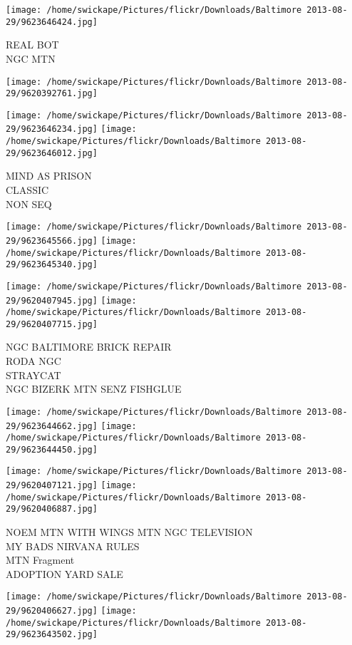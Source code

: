\documentclass[10pt,letterpaper]{article}
\begin{document}
\vspace{0.25in}
\texttt{[image: /home/swickape/Pictures/flickr/Downloads/Baltimore 2013-08-29/9623646424.jpg]}

REAL BOT\\
NGC MTN
\pagebreak

\texttt{[image: /home/swickape/Pictures/flickr/Downloads/Baltimore 2013-08-29/9620392761.jpg]}

\vspace{0.25in}
\texttt{[image: /home/swickape/Pictures/flickr/Downloads/Baltimore 2013-08-29/9623646234.jpg]}
\texttt{[image: /home/swickape/Pictures/flickr/Downloads/Baltimore 2013-08-29/9623646012.jpg]}

MIND AS PRISON\\
CLASSIC\\
NON SEQ
\pagebreak

\texttt{[image: /home/swickape/Pictures/flickr/Downloads/Baltimore 2013-08-29/9623645566.jpg]}
\texttt{[image: /home/swickape/Pictures/flickr/Downloads/Baltimore 2013-08-29/9623645340.jpg]}

\texttt{[image: /home/swickape/Pictures/flickr/Downloads/Baltimore 2013-08-29/9620407945.jpg]}
\texttt{[image: /home/swickape/Pictures/flickr/Downloads/Baltimore 2013-08-29/9620407715.jpg]}

NGC BALTIMORE BRICK REPAIR\\
RODA NGC\\
STRAYCAT\\
NGC BIZERK MTN SENZ FISHGLUE
\pagebreak

\texttt{[image: /home/swickape/Pictures/flickr/Downloads/Baltimore 2013-08-29/9623644662.jpg]}
\texttt{[image: /home/swickape/Pictures/flickr/Downloads/Baltimore 2013-08-29/9623644450.jpg]}

\texttt{[image: /home/swickape/Pictures/flickr/Downloads/Baltimore 2013-08-29/9620407121.jpg]}
\texttt{[image: /home/swickape/Pictures/flickr/Downloads/Baltimore 2013-08-29/9620406887.jpg]}

NOEM MTN WITH WINGS MTN NGC TELEVISION\\
MY BADS NIRVANA RULES\\
MTN Fragment\\
ADOPTION YARD SALE
\pagebreak

\texttt{[image: /home/swickape/Pictures/flickr/Downloads/Baltimore 2013-08-29/9620406627.jpg]}
\texttt{[image: /home/swickape/Pictures/flickr/Downloads/Baltimore 2013-08-29/9623643502.jpg]}
\end{document}
